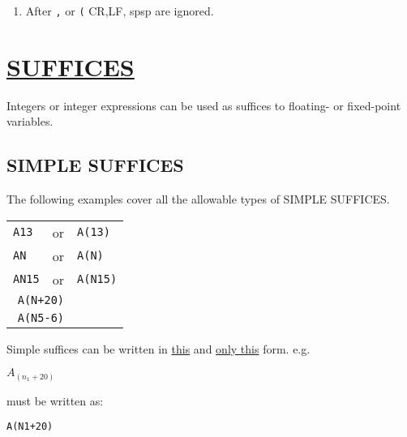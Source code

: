\documentclass[10pt, a4paper, oneside]{article}
\newcommand{\myuline}[1]{\uline{#1}}
\newcommand{\mytt}[1]{\texttt{\scriptsize #1}}
\newcommand{\mytt}[1]{\texttt{\small #1}}
\begin{document}
\begin{multicols}{2}
\begin{enumerate}
\begin{addmargin}[1cm]{1em}%
\begin{lstlisting}
1:ON(N)REPEAT
\end{lstlisting}
\end{addmargin}

which is the most common use of \mytt{ON}.

\item After \mytt{,} or \mytt{(} CR,LF, spsp are ignored.

\end{enumerate}


\section{\myuline{SUFFICES}}

Integers or integer expressions can be used as suffices
to floating- or fixed-point variables.

\subsection{SIMPLE SUFFICES}

The following examples cover all the allowable
types of SIMPLE SUFFICES.

\begin{addmargin}[1cm]{1em}%
\begin{tabular}{lrl}
\mytt{A13}  & or & \mytt{A(13)}  \\
\mytt{AN}   & or & \mytt{A(N)}   \\
\mytt{AN15} & or & \mytt{A(N15)} \\
\multicolumn{2}{r}{\mytt{A(N+20)}} & \\
\multicolumn{2}{r}{\mytt{A(N5-6)}} & \\
\end{tabular}
\end{addmargin}

Simple suffices can be written in \myuline{this} and \myuline{only this}
form. e.g.

\begin{addmargin}[1cm]{1em}%
\begin{math}
A_{(n_{1}+20)}
\end{math}
\end{addmargin}

\begin{flushleft}
must be written as:
\end{flushleft}

\begin{addmargin}[1cm]{1em}%
\begin{lstlisting}
A(N1+20)
\end{lstlisting}
\end{addmargin}


\end{multicols}
\end{document}
